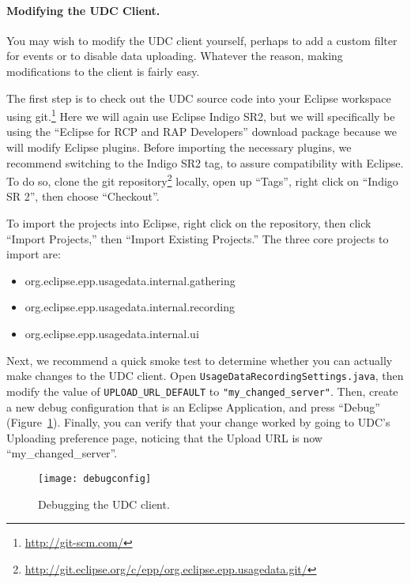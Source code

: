 \paragraph{Modifying the UDC Client.}

You may wish to modify the UDC client yourself, perhaps to add a custom filter for events
or to disable data uploading.
Whatever the reason, making modifications to the client is fairly easy.

The first step is to check out the UDC source code into your Eclipse
workspace using git.\footnote{\url{http://git-scm.com/}}
Here we will again use Eclipse Indigo SR2, but we will specifically be using the 
``Eclipse for RCP and RAP Developers'' download package because we will
modify Eclipse plugins.
Before importing the necessary plugins, we recommend switching to 
the Indigo SR2 tag, to assure compatibility with
Eclipse.
To do so, clone the git repository\footnote{\url{http://git.eclipse.org/c/epp/org.eclipse.epp.usagedata.git/}} 
locally, open up ``Tags'', right click on ``Indigo SR 2'',
then choose ``Checkout''.

To import the projects into Eclipse, right click on the repository, then click 
``Import Projects,'' then ``Import Existing Projects.''
The three core projects to import are:

\begin{itemize}
\item org.eclipse.epp.usagedata.internal.gathering
\item org.eclipse.epp.usagedata.internal.recording
\item org.eclipse.epp.usagedata.internal.ui
\end{itemize}

Next, we recommend a quick smoke test to determine whether you 
can actually make changes to the UDC client.
Open \texttt{UsageDataRecordingSettings.java}, then modify the value of \texttt{UPLOAD\_URL\_DEFAULT}
to \texttt{"my\_changed\_server"}.
Then, create a new debug configuration that is an Eclipse Application, and press 
``Debug'' (Figure~\ref{fig:debugconfig}).
Finally, you can verify that your change worked by going to UDC's Uploading 
preference page, noticing that the Upload URL is now ``my\_changed\_server''.

\begin{figure}
  \centering
  \texttt{[image: debugconfig]}
  \caption{Debugging the UDC client.}\label{fig:debugconfig}
\end{figure}

